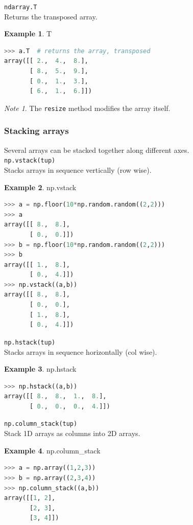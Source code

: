 \documentclass{article}
\theoremstyle{definition}
\newtheorem{ex}{Example}[subsection]
\theoremstyle{remark}
\newtheorem*{nb}{Note}
\newcommand{\func}[2]{\noindent\lstinline{#1}\\#2}
\begin{document}
\func{ndarray.T}{Returns the transposed array.}

\begin{ex} T
\begin{lstlisting}[language=Python]
>>> a.T  # returns the array, transposed
array([[ 2.,  4.,  8.],
       [ 8.,  5.,  9.],
       [ 0.,  1.,  3.],
       [ 6.,  1.,  6.]])
\end{lstlisting}
\end{ex}

\begin{nb}
The \lstinline{resize} method modifies the array itself.
\end{nb}

\subsubsection{Stacking arrays}

Several arrays can be stacked together along different axes.\\

\func{np.vstack(tup)}{Stacks arrays in sequence vertically (row wise).}

\begin{ex} np.vstack
\begin{lstlisting}[language=Python]
>>> a = np.floor(10*np.random.random((2,2)))
>>> a
array([[ 8.,  8.],
       [ 0.,  0.]])
>>> b = np.floor(10*np.random.random((2,2)))
>>> b
array([[ 1.,  8.],
       [ 0.,  4.]])
>>> np.vstack((a,b))
array([[ 8.,  8.],
       [ 0.,  0.],
       [ 1.,  8.],
       [ 0.,  4.]])
\end{lstlisting}
\end{ex}


\func{np.hstack(tup)}{Stacks arrays in sequence horizontally (col wise).}

\begin{ex} np.hstack
\begin{lstlisting}[language=Python]
>>> np.hstack((a,b))
array([[ 8.,  8.,  1.,  8.],
       [ 0.,  0.,  0.,  4.]])
\end{lstlisting}
\end{ex}

\func{np.column_stack(tup)}{Stack 1D arrays as columns into 2D arrays.}

\begin{ex} np.column\_stack
\begin{lstlisting}[language=Python]
>>> a = np.array((1,2,3))
>>> b = np.array((2,3,4))
>>> np.column_stack((a,b))
array([[1, 2],
       [2, 3],
       [3, 4]])
\end{lstlisting}
\end{ex}
\end{document}
